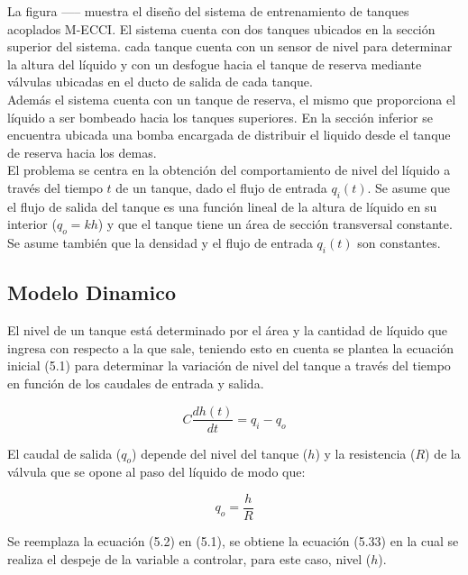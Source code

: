 \documentclass[a4paper,12pt,twoside]{proyectotanquesecci}
\begin{document}
La figura ----- muestra el diseño del sistema de entrenamiento de tanques acoplados M-ECCI. El sistema cuenta con dos tanques ubicados en la sección superior del sistema. cada tanque cuenta con un sensor de nivel para determinar la altura del líquido y con un desfogue hacia el tanque de reserva mediante válvulas
ubicadas en el ducto de salida de cada tanque. \\

Además el sistema cuenta con un tanque de reserva, el mismo que proporciona el líquido a ser bombeado hacia los tanques superiores. En la sección inferior se encuentra ubicada una bomba encargada de distribuir el liquido desde el tanque de reserva hacia los demas. \\

El problema se centra en la obtención del comportamiento de nivel del líquido a través del tiempo $t$ de un tanque, dado el flujo de entrada $q_{i}(t)$. Se asume que el flujo de salida del tanque es una función lineal de la altura de líquido en su interior ($q_{o}=kh$) y que el tanque tiene un área de sección transversal constante. Se asume también que la densidad y el flujo de entrada $q_{i}(t)$ son constantes. \\

\subsection{Modelo Dinamico}

El nivel de un tanque está determinado por el área y la cantidad de líquido que ingresa con respecto a la que sale, teniendo esto en cuenta se plantea la ecuación inicial (5.1) para determinar la variación de nivel del tanque a través del tiempo en función de los caudales de entrada y salida.

\begin{equation}
C\frac {dh\left( t\right) }{dt}=q_{i}-q_{o}
\end{equation}

El caudal de salida ($q_{o}$) depende del nivel del tanque ($h$) y la resistencia ($R$) de la válvula que se opone al paso del líquido de modo que:

\begin{equation}
q_{o}=\frac{h}{R}
\end{equation}

Se reemplaza la ecuación (5.2) en (5.1), se obtiene la ecuación (5.33) en la cual se realiza el despeje de la variable a controlar, para este caso, nivel ($h$).
\end{document}
